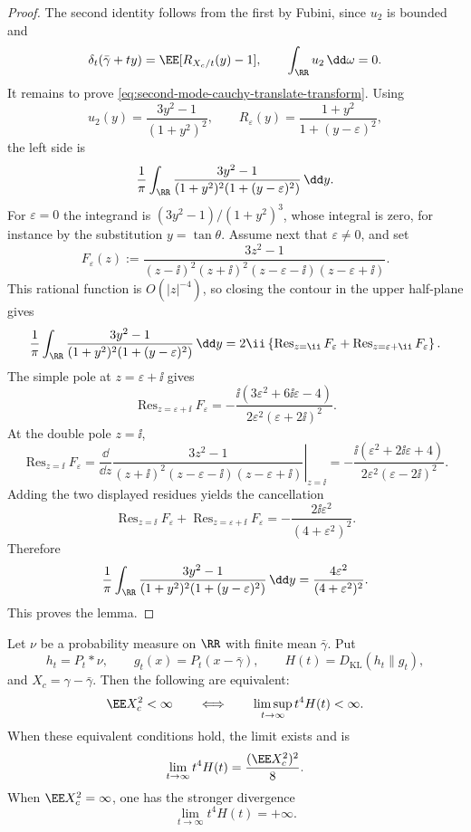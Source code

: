 \begin{proof}
The second identity follows from the first by Fubini, since \(u_2\) is
bounded and
\[
\delta_t(\bar{\gamma}+ty)=\EE[R_{X_c/t}(y)-1],
\qquad
\int_{\RR}u_2\,\dd\omega=0 .
\]
It remains to prove \eqref{eq:second-mode-cauchy-translate-transform}.  Using
\[
u_2(y)=\frac{3y^2-1}{(1+y^2)^2},\qquad
R_\varepsilon(y)=\frac{1+y^2}{1+(y-\varepsilon)^2},
\]
the left side is
\[
\frac1\pi\int_{\RR}
\frac{3y^2-1}{(1+y^2)^2(1+(y-\varepsilon)^2)}\,\dd y .
\]
For \(\varepsilon=0\) the integrand is
\((3y^2-1)/(1+y^2)^3\), whose integral is zero, for instance by the
substitution \(y=\tan\theta\).  Assume next that \(\varepsilon\ne0\), and set
\[
F_\varepsilon(z):=
\frac{3z^2-1}
{(z-\ii)^2(z+\ii)^2(z-\varepsilon-\ii)(z-\varepsilon+\ii)} .
\]
This rational function is \(O(|z|^{-4})\), so closing the contour in the
upper half-plane gives
\[
\frac1\pi\int_{\RR}
\frac{3y^2-1}{(1+y^2)^2(1+(y-\varepsilon)^2)}\,\dd y
=
2\ii\left\{
\operatorname{Res}_{z=\ii}F_\varepsilon
+\operatorname{Res}_{z=\varepsilon+\ii}F_\varepsilon
\right\}.
\]
The simple pole at \(z=\varepsilon+\ii\) gives
\[
\operatorname{Res}_{z=\varepsilon+\ii}F_\varepsilon
=-\frac{\ii(3\varepsilon^2+6\ii\varepsilon-4)}
{2\varepsilon^2(\varepsilon+2\ii)^2}.
\]
At the double pole \(z=\ii\),
\[
\operatorname{Res}_{z=\ii}F_\varepsilon
=
\left.
\frac{\dd}{\dd z}
\frac{3z^2-1}
{(z+\ii)^2(z-\varepsilon-\ii)(z-\varepsilon+\ii)}
\right|_{z=\ii}
=-\frac{\ii(\varepsilon^2+2\ii\varepsilon+4)}
{2\varepsilon^2(\varepsilon-2\ii)^2}.
\]
Adding the two displayed residues yields the cancellation
\[
\operatorname{Res}_{z=\ii}F_\varepsilon
+\operatorname{Res}_{z=\varepsilon+\ii}F_\varepsilon
=-\frac{2\ii\varepsilon^2}{(4+\varepsilon^2)^2}.
\]
Therefore
\[
\frac1\pi\int_{\RR}
\frac{3y^2-1}{(1+y^2)^2(1+(y-\varepsilon)^2)}\,\dd y
=\frac{4\varepsilon^2}{(4+\varepsilon^2)^2}.
\]
This proves the lemma.
\end{proof}

\begin{theorem}%
\label{thm:sharp-leading-kl-variance-threshold}
Let \(\nu\) be a probability measure on \(\RR\) with finite mean
\(\bar{\gamma}\).  Put
\[
h_t=P_t*\nu,\qquad g_t(x)=P_t(x-\bar{\gamma}),\qquad
H(t)=D_{\mathrm{KL}}(h_t\|g_t),
\]
and \(X_c=\gamma-\bar{\gamma}\).  Then the following are equivalent:
\[
\EE X_c^2<\infty
\qquad\Longleftrightarrow\qquad
\limsup_{t\to\infty}t^4H(t)<\infty .
\]
When these equivalent conditions hold, the limit exists and is
\begin{equation}\label{eq:sharp-leading-kl-variance-threshold-finite}
\lim_{t\to\infty}t^4H(t)=\frac{(\EE X_c^2)^2}{8}.
\end{equation}
When \(\EE X_c^2=\infty\), one has the stronger divergence
\begin{equation}\label{eq:sharp-leading-kl-variance-threshold-infinite}
\lim_{t\to\infty}t^4H(t)=+\infty .
\end{equation}
\end{theorem}

